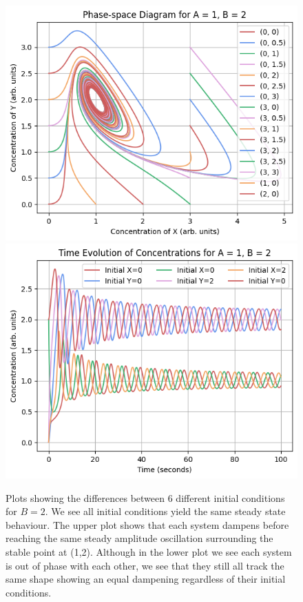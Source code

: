 \documentclass[reprint, amsmath, amssymb, aps]{revtex4-2}
\begin{document}
\begin{figure}
\includegraphics[width=0.85\columnwidth]{variationOfInitialConditions_phase.png}
\includegraphics[width=0.85\columnwidth]{variationOfInitialConditions_evolution.png}
\caption{\label{fig:multiPlot}Plots showing the differences between 6 different initial conditions for $B=2$. We see all initial conditions yield the same steady state behaviour. The upper plot shows that each system dampens before reaching the same steady amplitude oscillation surrounding the stable point at (1,2). Although in the lower plot we see each system is out of phase with each other, we see that they still all track the same shape showing an equal dampening regardless of their initial conditions.}
\end{figure} 
\end{document}
